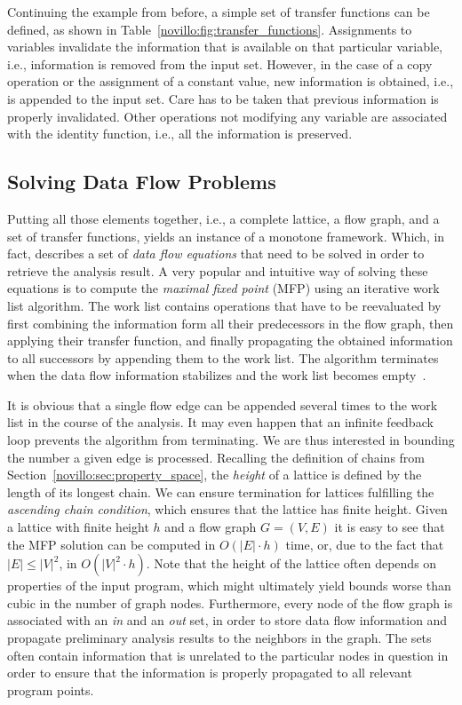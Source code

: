 Continuing the example from before, a simple set of transfer functions can be
defined, as shown in Table~\ref{novillo:fig:transfer_functions}. Assignments to
variables invalidate the information that is available on that particular
variable, i.e., information is removed from the input set. However, in the case
of a copy operation or the assignment of a constant value, new information is
obtained, i.e., is appended to the input set. Care has to be taken that
previous information is properly invalidated. Other operations not modifying any
variable are associated with the identity function, i.e., all the information is
preserved.

\subsection{Solving Data Flow Problems}

Putting all those elements together, i.e., a complete lattice, a flow graph, and
a set of transfer functions, yields an instance of a monotone framework. Which,
in fact, describes a set of \emph{data flow equations} that need to be solved in
order to retrieve the analysis result. A very popular and intuitive way of
solving these equations is to compute the \emph{maximal fixed point} (MFP) using
an iterative work list algorithm. The work list contains operations that have
to be reevaluated by first combining the information form all their predecessors
in the flow graph, then applying their transfer function, and finally
propagating the obtained information to all successors by appending them to the
work list. The algorithm terminates when the data flow information stabilizes
and the work list becomes empty~\cite{novillo:bib:NNH99}.

It is obvious that a single flow edge can be appended several times to the
work list in the course of the analysis. It may even happen that an infinite
feedback loop prevents the algorithm from terminating. We are thus interested in
bounding the number a given edge is processed. Recalling the definition of
chains from Section~\ref{novillo:sec:property_space}, the \emph{height} of a
lattice is defined by the length of its longest chain. We can ensure termination
for lattices fulfilling the \emph{ascending chain condition}, which ensures that
the lattice has finite height. Given a lattice with finite height $h$ and a flow
graph $G=(V, E)$ it is easy to see that the MFP solution can be computed in
$O(|E| \cdot h)$ time, or, due to the fact that $|E| \leq |V|^2$, in $O(|V|^2
\cdot h)$. Note that the height of the lattice often depends on properties of
the input program, which might ultimately yield bounds worse than cubic in the
number of graph nodes. Furthermore, every node of the flow graph is associated
with an \emph{in} and an \emph{out} set, in order to store data flow
information and propagate preliminary analysis results to the neighbors in the
graph. The sets often contain information that is unrelated to the particular
nodes in question in order to ensure that the information is properly propagated
to all relevant program points.

